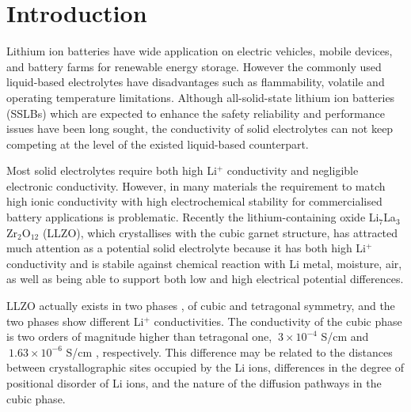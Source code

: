 \documentclass[twoside,twocolumn,9pt]{article}
\begin{document}



\section{Introduction}

Lithium ion batteries have wide application on electric vehicles, mobile devices, and battery
farms for renewable energy storage.  However the commonly used liquid-based electrolytes have
disadvantages such as flammability, volatile  and operating temperature limitations.
Although all-solid-state lithium ion batteries (SSLBs) which are expected to enhance the safety
reliability and performance issues have been long sought, the conductivity of solid electrolytes can not
keep competing at the level of the existed liquid-based counterpart.

Most solid electrolytes require both high Li$^+$ conductivity and negligible electronic
conductivity. However, in many materials the requirement to match high ionic conductivity with high electrochemical stability for commercialised battery applications is problematic. Recently the lithium-containing oxide  Li$_7$La$_3$Zr$_2$O$_{12}$ (LLZO)\cite{Murugan:2007eg, Samson:2019eo, Kataoka:2020bg}, which crystallises with the cubic garnet structure, has attracted much attention as a potential solid electrolyte because it has both high Li$^+$ conductivity and is stabile against chemical
reaction with Li metal, moisture, air, as well as being able to support both low and high electrical potential differences.

LLZO actually exists in two phases \cite{Geiger:2011cg}, of
cubic and tetragonal symmetry, and the two phases show different Li$^+$ conductivities. The conductivity of the cubic
phase is two orders of magnitude higher than tetragonal one, $~3\times 10^{-4}$ S/cm \cite{Murugan:2007eg}
and $~1.63\times 10^{-6}$ S/cm \cite{Awaka:2009jv}, respectively.
This difference may be related to the distances between crystallographic sites occupied by the Li ions, differences in the degree of positional disorder of Li ions, and the nature of the diffusion pathways in the cubic phase.
\end{document}
